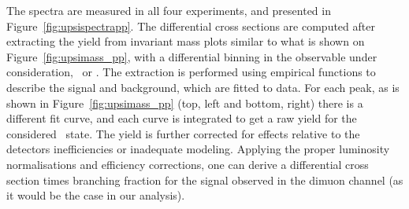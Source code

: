 The \pt spectra are measured in all four experiments, and presented
in Figure~\ref{fig:upsispectrapp}. The differential cross sections are
computed after extracting the yield from invariant mass plots similar to what is
shown on Figure~\ref{fig:upsimass_pp}, with a differential binning in
the observable under consideration, \pt\ or \y. The extraction is performed using
empirical functions to describe the signal and background, which are
fitted to data. For each peak, as is shown in
Figure~\ref{fig:upsimass_pp} (top, left and bottom, right) there is a
different fit curve, and each curve is integrated to get a raw
yield for the considered \PgU~state. The yield is further corrected
for effects relative to the detectors inefficiencies or inadequate
modeling. Applying the proper luminosity normalisations and efficiency
corrections, one can derive a differential cross section times
branching fraction for the signal observed in the dimuon channel (as
it would be the case in our analysis).
\\
